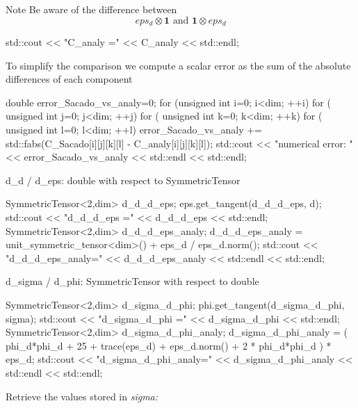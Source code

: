  \begin{DoxyNote}{Note}
Be aware of the difference between \[ eps_d \otimes \boldsymbol{1} \text{ and } \boldsymbol{1} \otimes eps_d \] 
\begin{DoxyCode}
std::cout << \textcolor{stringliteral}{"C\_analy ="} << C\_analy << std::endl;
\end{DoxyCode}
 To simplify the comparison we compute a scalar error as the sum of the absolute differences of each component 
\begin{DoxyCode}
\textcolor{keywordtype}{double} error\_Sacado\_vs\_analy=0;
\textcolor{keywordflow}{for} (\textcolor{keywordtype}{unsigned} \textcolor{keywordtype}{int} i=0; i<dim; ++i)
     \textcolor{keywordflow}{for} ( \textcolor{keywordtype}{unsigned} \textcolor{keywordtype}{int} j=0; j<dim; ++j)
         \textcolor{keywordflow}{for} ( \textcolor{keywordtype}{unsigned} \textcolor{keywordtype}{int} k=0; k<dim; ++k)
             \textcolor{keywordflow}{for} ( \textcolor{keywordtype}{unsigned} \textcolor{keywordtype}{int} l=0; l<dim; ++l)
                 error\_Sacado\_vs\_analy += std::fabs(C\_Sacado[i][j][k][l] - C\_analy[i][j][k][l]);
std::cout << \textcolor{stringliteral}{"numerical error: "} << error\_Sacado\_vs\_analy << std::endl << std::endl;
\end{DoxyCode}
 d\+\_\+d / d\+\_\+eps\+: double with respect to Symmetric\+Tensor 
\begin{DoxyCode}
SymmetricTensor<2,dim> d\_d\_d\_eps;
eps.get\_tangent(d\_d\_d\_eps, d);
std::cout << \textcolor{stringliteral}{"d\_d\_d\_eps      ="} << d\_d\_d\_eps << std::endl;
SymmetricTensor<2,dim> d\_d\_d\_eps\_analy;
d\_d\_d\_eps\_analy = unit\_symmetric\_tensor<dim>() + eps\_d / eps\_d.norm();
std::cout << \textcolor{stringliteral}{"d\_d\_d\_eps\_analy="} << d\_d\_d\_eps\_analy << std::endl << std::endl;
\end{DoxyCode}
 d\+\_\+sigma / d\+\_\+phi\+: Symmetric\+Tensor with respect to double 
\begin{DoxyCode}
SymmetricTensor<2,dim> d\_sigma\_d\_phi;
phi.get\_tangent(d\_sigma\_d\_phi, sigma);
std::cout << \textcolor{stringliteral}{"d\_sigma\_d\_phi      ="} << d\_sigma\_d\_phi << std::endl;
SymmetricTensor<2,dim> d\_sigma\_d\_phi\_analy;
d\_sigma\_d\_phi\_analy = ( phi\_d*phi\_d + 25 + trace(eps\_d) + eps\_d.norm() + 2 * phi\_d*phi\_d ) * eps\_d;
std::cout << \textcolor{stringliteral}{"d\_sigma\_d\_phi\_analy="} << d\_sigma\_d\_phi\_analy << std::endl << std::endl;
\end{DoxyCode}
 Retrieve the values stored in {\itshape sigma\+:} 

\end{DoxyNote}
